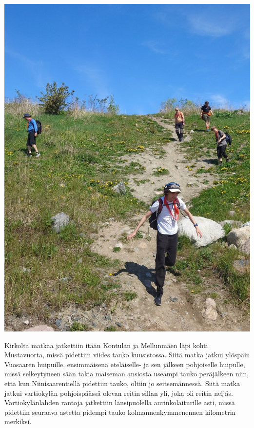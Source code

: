 \begin{multicols}{2}
\vspace*{-0.16cm}
\begin{center}
\includegraphics[width=0.9\linewidth]{assets/liljaVuosaarenhuippu.JPG}
\end{center}

Kirkolta matkaa jatkettiin itään Kontulan ja Mellunmäen läpi kohti Mustavuorta, missä pidettiin viides tauko kuusistossa. Siitä matka jatkui ylöspäin Vuosaaren huipuille, ensimmäisenä eteläiselle- ja sen jälkeen pohjoiselle huipulle, missä selkeytyneen sään takia maiseman ansiosta useampi tauko peräjälkeen niin, että kun Niinisaarentiellä pidettiin tauko, oltiin jo seitsemännessä. Siitä matka jatkui vartiokylän pohjoispäässä olevan reitin sillan yli, joka oli reitin neljäs. Vartiokylänlahden rantoja jatkettiin länsipuolella aurinkolaiturille asti, missä pidettiin seuraava astetta pidempi tauko kolmannenkymmenennen kilometrin merkiksi.


\end{multicols}

